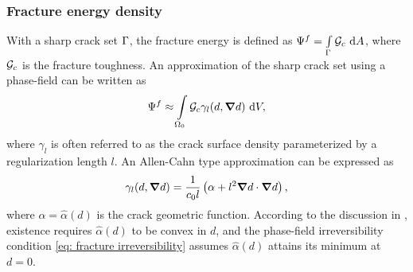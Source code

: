 \subsubsection{Fracture energy density}
\label{section: chapter3/theory/fracture}

With a sharp crack set $\Gamma$, the fracture energy is defined as $\Psi^f = \int\limits_\Gamma {\mathcal{G}_c} \text{ d}A$, where ${\mathcal{G}_c}$ is the fracture toughness. An approximation of the sharp crack set using a phase-field can be written as
\begin{align}
  \Psi^f \approx \int\limits_{\Omega_0} {\mathcal{G}_c} \gamma_l(d, \boldsymbol{\nabla} d) \text{ d}V, \label{eq: fracture energy density}
\end{align}
where $\gamma_l$ is often referred to as the crack surface density parameterized by a regularization length $l$. An Allen-Cahn type approximation can be expressed as
\begin{align}
  \gamma_l(d, \boldsymbol{\nabla} d) = \dfrac{1}{c_0 l}\left( \alpha + l^2 \boldsymbol{\nabla} d \cdot \boldsymbol{\nabla} d \right), \label{eq: crack surface density}
\end{align}
where $\alpha = \hat{\alpha}(d)$ is the crack geometric function. According to the discussion in , existence requires $\hat{\alpha}(d)$ to be convex in $d$, and the phase-field irreversibility condition \eqref{eq: fracture irreversibility} assumes $\hat{\alpha}(d)$ attains its minimum at $d = 0$.

